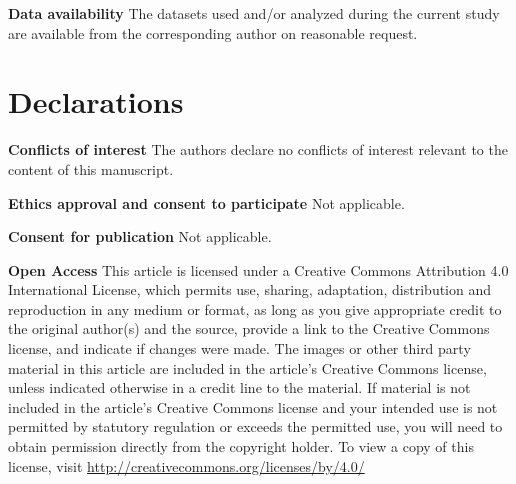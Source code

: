 \documentclass[referee,pdflatex,sn-basic]{sn-jnl}%
\theoremstyle{thmstyleone}%
\theoremstyle{thmstyletwo}%
\theoremstyle{thmstylethree}%
\begin{document}
\textbf{Data availability}
The datasets used and/or analyzed during 
the current study are available from the corresponding author on 
reasonable request.


\section*{Declarations}

\textbf{Conflicts of interest}
The authors declare no conflicts of interest relevant to the content 
of this manuscript.

\textbf{Ethics approval and consent to participate}
Not applicable.

\textbf{Consent for publication}
Not applicable.

\textbf{Open Access}
This article is licensed under a Creative Commons 
Attribution 4.0 International License, which permits use, sharing, 
adaptation, distribution and reproduction in any medium or format, as long
as you give appropriate credit to the original author(s) and the source,
provide a link to the Creative Commons license, and indicate if changes
were made. The images or other third party material in this article are
included in the article's Creative Commons license, unless indicated
otherwise in a credit line to the material. If material is not included 
in the article's Creative Commons license and your intended use is not
permitted by statutory regulation or exceeds the permitted use, you will
need to obtain permission directly from the copyright holder. To view a
copy of this license, visit \url{http://creativecommons.org/licenses/by/4.0/}
\end{document}
